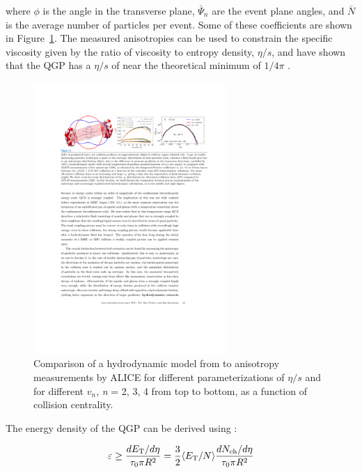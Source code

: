 where $\phi$ is the angle in the transverse plane, $\bar{\Psi}_n$ are the event plane angles, and $\bar{N}$ is the average number of particles per event. Some of these coefficients are shown in Figure~\ref{fig:flow_coeff}. The measured anisotropies can be used to constrain the specific viscosity given by the ratio of viscosity to entropy density, $\eta / s$, and have shown that the QGP has a $\eta / s$ of near the theoretical minimum of $1/4\pi$ \cite{Heinz:2013th}.


\begin{figure}[htbp]
\begin{center}
\includegraphics[width=0.65\textwidth]{figures/theory/flow_coefficients}
\caption{Comparison of a hydrodynamic model from \cite{Niemi:2015qia} to anisotropy measurements by ALICE \cite{ALICE:2011ab} for different parameterizations of $\eta / s $ and for different $v_n$, {\it{n}} = 2, 3, 4 from top to bottom, as a function of collision centrality.}
\label{fig:flow_coeff}
\end{center}
\end{figure}

The energy density of the QGP can be derived using \cite{PhysRevD.27.140}:

\begin{align}
\varepsilon \geq \frac{d\mbox{$E_{\mathrm{T}}$}/d\eta}{\tau_0 \pi R^2} = \frac{3}{2} \langle \mbox{$E_{\mathrm{T}}$}/N \rangle \frac{d\mbox{$N_{\mathrm{ch}}$}/d\eta}{\tau_0 \pi R^2}
\end{align}

